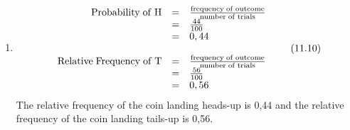 {\begin{mdframed}[linewidth=4, leftmargin=40, rightmargin=40]
\begin{exercise}
\begin{enumerate}[noitemsep, label=\textbf{Step} \textbf{\arabic*}. ]
      \item  
      \label{m39373*id113501}\nopagebreak\noindent{}
    \begin{equation}
    \begin{array}{ccc}\hfill \mathrm{Probability\; of\; H}& =& \frac{\mathrm{frequency\; of\; outcome}}{\mathrm{number\; of\; trials}}\hfill \\ & =& \frac{44}{100}\hfill \\ & =& 0,44\hfill \\ \\ \hfill \mathrm{Relative\; Frequency\; of\; T}& =& \frac{\mathrm{frequency\; of\; outcome}}{\mathrm{number\; of\; trials}}\hfill \\ & =& \frac{56}{100}\hfill \\ & =& 0,56\hfill \end{array}\tag{11.10}
      \end{equation}
      \label{m39373*id113660}The relative frequency of the coin landing heads-up is
0,44 and the relative frequency of the coin landing tails-up is 0,56. \par 
      \end{enumerate}
    \end{exercise}
    \end{mdframed}
    }
    \noindent
\label{m39373*secfhsst!!!underscore!!!id649}\vspace{.5cm} 
      \noindent
